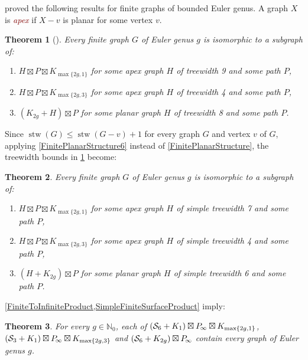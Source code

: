 \documentclass[a4paper,11pt]{article}
\newcommand{\defn}[1]{\textcolor{Maroon}{\emph{#1}}\index{#1}}
\theoremstyle{plain}
\newtheorem{thm}{Theorem}[section]
\theoremstyle{definition}
\renewcommand{\leq}{\leqslant}
\DeclareMathOperator{\stw}{stw}
\newcommand{\PP}{P_{\hspace{-0.25ex}\infty}}
\newcommand{\NN}{\mathbb{N}}
\renewcommand{\SS}{\mathcal{S}}
\begin{document}
\citet{DJMMUW20} proved the following results for finite graphs of bounded Euler genus. A graph $X$ is \defn{apex} if $X-v$ is planar for some vertex $v$. 

\begin{thm}[\citep{DJMMUW20}]
\label{FiniteSurfaceProduct}
Every finite graph $G$ of Euler genus $g$ is isomorphic to a subgraph of:
\begin{enumerate}[label=(\alph*)]
\item $H \boxtimes P \boxtimes K_{\max\{2g,1\}}$ for some apex graph $H$ of treewidth 9 and some path $P$, 
\item $H \boxtimes P \boxtimes K_{\max\{2g,3\}}$ for some apex graph $H$ of treewidth 4 and some path $P$,
\item $(K_{2g} + H ) \boxtimes P$ for some planar graph $H$ of treewidth 8 and some path $P$.
\end{enumerate}
\end{thm}

Since $\stw(G)\leq \stw(G-v)+1$ for every graph $G$ and vertex $v$ of $G$, applying \cref{FinitePlanarStructure6} instead of \cref{FinitePlanarStructure}, the treewidth bounds in \cref{FiniteSurfaceProduct} become:

\begin{thm}
\label{SimpleFiniteSurfaceProduct}
Every finite graph $G$ of Euler genus $g$ is isomorphic to a subgraph of: 
\begin{enumerate}[label=(\alph*)]
\item $ H \boxtimes P \boxtimes K_{\max\{2g,1\}}$ for some apex graph $H$ of simple treewidth 7 and some path $P$, 
\item $H \boxtimes P \boxtimes K_{\max\{2g,3\}}$ for some apex graph $H$ of simple treewidth 4 and some path $P$,
\item $(H + K_{2g} ) \boxtimes P$ for some planar graph $H$ of simple treewidth 6 and some path $P$.
\end{enumerate}
\end{thm}

\cref{FiniteToInfiniteProduct,SimpleFiniteSurfaceProduct} imply:

\begin{thm}
\label{InfiniteSurfaceProduct}
For every $g\in\NN_0$, each of
$(\SS_6+K_1) \boxtimes \PP \boxtimes K_{\max\{2g,1\}}$, 
$(\SS_3+K_1) \boxtimes \PP \boxtimes K_{\max\{2g,3\}}$ and  
$(\SS_6 +K_{2g} )  \boxtimes \PP$ 
contain every graph of Euler genus $g$.
\end{thm}
\end{document}
